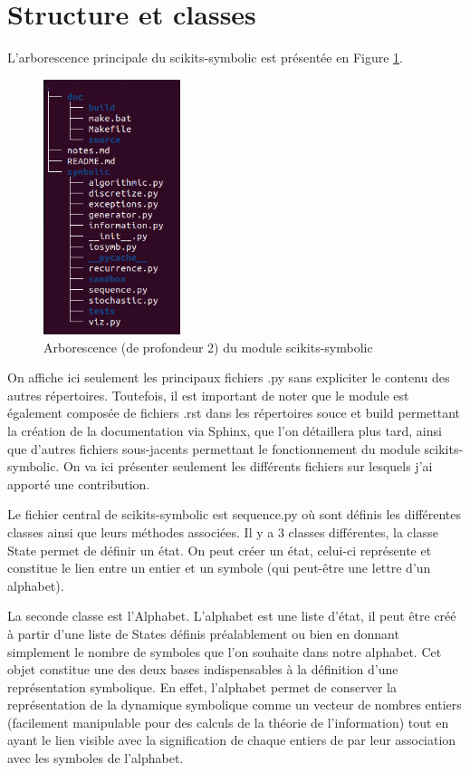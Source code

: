 \section{Structure et classes}

L'arborescence principale du scikits-symbolic est présentée en Figure \ref{fig5.1}.

\begin{figure}[!ht]
    \centering
    \includegraphics[width=4cm]{arborescence.png}
    \caption{Arborescence (de profondeur 2) du module scikits-symbolic}
    \label{fig5.1}
\end{figure}

\vspace{2ex}
On affiche ici seulement les principaux fichiers .py sans expliciter le contenu des autres répertoires. Toutefois, il est important de noter que le module est également composée de fichiers .rst dans les répertoires souce et build permettant la création de la documentation via Sphinx, que l'on détaillera plus tard, ainsi que d'autres fichiers sous-jacents permettant le fonctionnement du module scikits-symbolic. On va ici présenter seulement les différents fichiers sur lesquels j'ai apporté une contribution.

\vspace{2ex}
Le fichier central de scikits-symbolic est sequence.py où sont définis les différentes classes ainsi que leurs méthodes associées. Il y a 3 classes différentes, la classe State permet de définir un état. On peut créer un état, celui-ci représente et constitue le lien entre un entier et un symbole (qui peut-être une lettre d’un alphabet). 

\vspace{2ex}
La seconde classe est l’Alphabet. L’alphabet est une liste d’état, il peut être créé à partir d’une liste de States définis préalablement ou bien en donnant simplement le nombre de symboles que l’on souhaite dans notre alphabet. Cet objet  constitue une des deux bases indispensables à la définition d’une représentation symbolique. En effet, l’alphabet permet de conserver la représentation de la dynamique symbolique comme un vecteur de nombres entiers (facilement manipulable pour des calculs de la théorie de l’information) tout en ayant le lien visible avec la signification de chaque entiers de par leur association avec les symboles de l’alphabet. 

